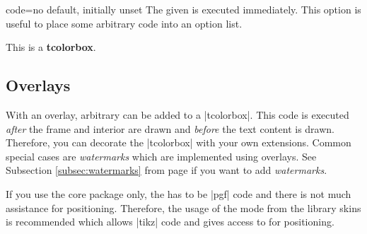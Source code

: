 \clearpage
\begin{docTcbKey}{code}{=}{no default, initially unset}
  The given  is executed immediately. This option is useful
  to place some arbitrary code into an option list.
\begin{dispExample}

\begin{tcolorbox}[code={\newcommand{\mycommand}{\textit{working}}},
  title=My \mycommand\ title]
This is a \textbf{tcolorbox}.
\end{tcolorbox}
\end{dispExample}
\end{docTcbKey}

\clearpage
\subsection{Overlays}\label{subsec:overlays}
With an overlay, arbitrary  can be added to a
|tcolorbox|. This code is executed \emph{after} the frame and interior are
drawn and \emph{before} the text content is drawn. Therefore, you can
decorate the |tcolorbox| with your own extensions.
Common special cases are \emph{watermarks} which are implemented using overlays.
See Subsection \ref{subsec:watermarks} from page \pageref{subsec:watermarks} if
you want to add \emph{watermarks}.
\begin{marker}
If you use the core package only, the  has to be |pgf| code
and there is not much assistance for positioning.
Therefore, the usage of the  mode from the library skins
is recommended which allows |tikz| code and gives access to
 for positioning.
\end{marker}

